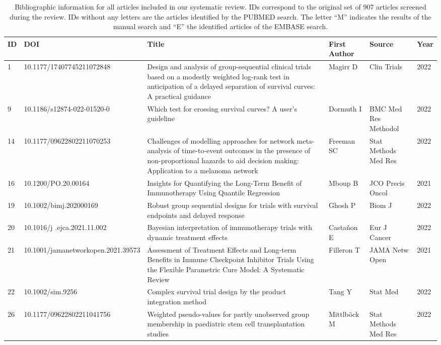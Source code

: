 \begin{landscape}
    \begin{longtable}{|p{0.3in}|p{1.8in}|p{2.4in}|p{0.68in}|p{0.89in}|p{0.3in}|}
     \caption{Bibliographic information for all articles included in our systematic review. IDs correspond to the original set of 907 articles screened during the review. IDs without any letters are the articles identified by the PUBMED search. The letter ``M'' indicates the results of the manual search and ``E'' the identified articles of the EMBASE search. }
    \label{tab:S3}
    \\
    \hline 
ID & DOI & Title & First Author & Source & Year \\ \hline 
1 & 10.1177/17407745211072848          & Design and analysis of group-sequential clinical trials based on a modestly weighted log-rank test in anticipation of a delayed separation of survival curves: A practical guidance & Magirr D & Clin Trials & 2022 \\ \hline 
9 & 10.1186/s12874-022-01520-0           & Which test for crossing survival curves? A user's guideline & Dormuth I & BMC Med Res Methodol & 2022 \\ \hline 
14 & 10.1177/09622802211070253          & Challenges of modelling approaches for network meta-analysis of time-to-event outcomes in the presence of non-proportional hazards to aid decision making: Application to a melanoma network & Freeman SC & Stat Methods Med Res & 2022 \\ \hline 
16 & 10.1200/PO.20.00164         & Insights for Quantifying the Long-Term Benefit of Immunotherapy Using Quantile Regression & Mboup B & JCO Precis Oncol & 2021 \\ \hline 
19 & 10.1002/bimj.202000169      & Robust group sequential designs for trials with survival endpoints and delayed response & Ghosh P & Biom J & 2022 \\ \hline 
20 & 10.1016/j    .ejca.2021.11.002    & Bayesian interpretation of immunotherapy trials with dynamic treatment effects & Casta\~{n}on E & Eur J Cancer & 2022 \\ \hline 
21 & 10.1001/\-jamanetworkopen.2021.39573     & Assessment of Treatment Effects and Long-term Benefits in Immune Checkpoint Inhibitor Trials Using the Flexible Parametric Cure Model: A Systematic Review & Filleron T & JAMA Netw Open & 2021 \\ \hline 
22 & 10.1002/sim.9256          & Complex survival trial design by the product integration method & Tang Y & Stat Med & 2022 \\ \hline 
26 & 10.1177/09622802211041756         & Weighted pseudo-values for partly unobserved group membership in paediatric stem cell transplantation studies & Mittlb\"{o}ck M & Stat Methods Med Res & 2022 \\ \hline 

\end{longtable}
\end{landscape}
